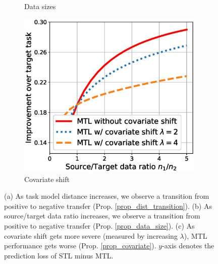 \begin{figure}[!t]
\begin{subfigure}[b]{0.32\textwidth}
		\caption{Data sizes}
		\label{fig_size}
	\end{subfigure}\hfill
	\begin{subfigure}[b]{0.32\textwidth}
		\centering
		\includegraphics[width=0.98\textwidth]{figures/complementary.eps}
		\caption{Covariate shift}
		\label{fig_covariate}
	\end{subfigure}
	\caption{%
	(a) As task model distance increases, we observe a transition from positive to negative transfer  (Prop. \ref{prop_dist_transition}).
	(b) As source/target data ratio increases, we observe a transition from positive to negative transfer (Prop. \ref{prop_data_size}).
	(c) As covariate shift gets more severe (measured by increasing $\lambda$), MTL performance gets worse (Prop. \ref{prop_covariate}).
	$y$-axis denotes the prediction loss of STL minus MTL.}
	\label{fig_model_shift_phasetrans}
	\vspace{-0.2in}
\end{figure}



